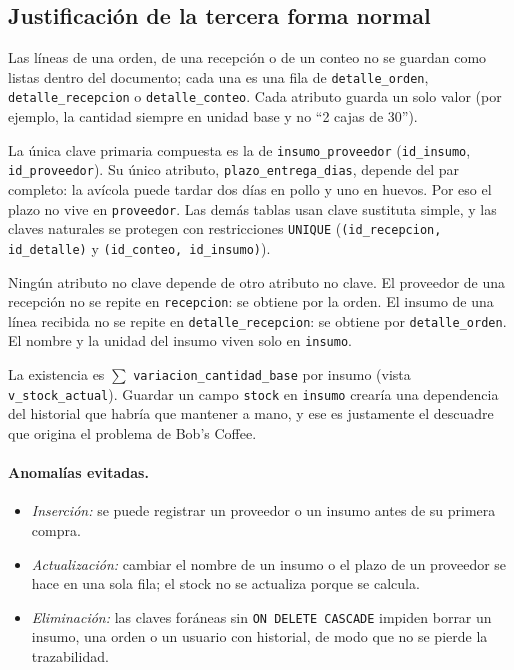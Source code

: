 \documentclass[11pt,letterpaper]{article}
\begin{document}
\subsection{Justificación de la tercera forma normal}
\begin{description}[leftmargin=0.5cm,style=nextline]
\item[1FN -- atributos atómicos, sin grupos repetidos.] Las líneas de una orden, de una recepción o de un conteo no se guardan como listas dentro del documento; cada una es una fila de \texttt{detalle\_orden}, \texttt{detalle\_recepcion} o \texttt{detalle\_conteo}. Cada atributo guarda un solo valor (por ejemplo, la cantidad siempre en unidad base y no ``2 cajas de 30'').
\item[2FN -- dependencia total de la clave.] La única clave primaria compuesta es la de \texttt{insumo\_proveedor} (\texttt{id\_insumo}, \texttt{id\_proveedor}). Su único atributo, \texttt{plazo\_entrega\_dias}, depende del par completo: la avícola puede tardar dos días en pollo y uno en huevos. Por eso el plazo no vive en \texttt{proveedor}. Las demás tablas usan clave sustituta simple, y las claves naturales se protegen con restricciones \texttt{UNIQUE} (\texttt{(id\_recepcion, id\_detalle)} y \texttt{(id\_conteo, id\_insumo)}).
\item[3FN -- sin dependencias transitivas.] Ningún atributo no clave depende de otro atributo no clave. El proveedor de una recepción no se repite en \texttt{recepcion}: se obtiene por la orden. El insumo de una línea recibida no se repite en \texttt{detalle\_recepcion}: se obtiene por \texttt{detalle\_orden}. El nombre y la unidad del insumo viven solo en \texttt{insumo}.
\item[Stock derivado, no almacenado.] La existencia es $\sum$ \texttt{variacion\_cantidad\_base} por insumo (vista \texttt{v\_stock\_actual}). Guardar un campo \texttt{stock} en \texttt{insumo} crearía una dependencia del historial que habría que mantener a mano, y ese es justamente el descuadre que origina el problema de Bob's Coffee.
\end{description}

\paragraph{Anomalías evitadas.}
\begin{itemize}[leftmargin=*,itemsep=1pt]
  \item \emph{Inserción:} se puede registrar un proveedor o un insumo antes de su primera compra.
  \item \emph{Actualización:} cambiar el nombre de un insumo o el plazo de un proveedor se hace en una sola fila; el stock no se actualiza porque se calcula.
  \item \emph{Eliminación:} las claves foráneas sin \texttt{ON DELETE CASCADE} impiden borrar un insumo, una orden o un usuario con historial, de modo que no se pierde la trazabilidad.
\end{itemize}
\end{document}
